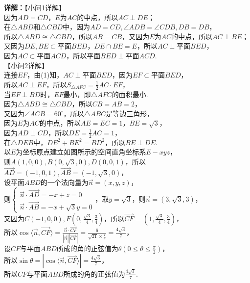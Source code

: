 \begin{question}[points=12]
\begin{solution}
\textbf{详解：}【小问1详解】\\因为$AD=CD$，$E$为$AC$的中点，所以$AC\perp DE$；\\在$\triangle ABD$和$\triangle CBD$中，因为$AD=CD, \angle ADB=\angle CDB, DB=DB$，\\所以$\triangle ABD \cong \triangle CBD$，所以$AB=CB$，又因为$E$为$AC$的中点，所以$AC\perp BE$；\\又因为$DE, BE\subset$平面$BED$，$DE\cap BE=E$，所以$AC\perp$平面$BED$，\\因为$AC\subset$平面$ACD$，所以平面$BED\perp$平面$ACD$.\\【小问2详解】\\连接$EF$，由(1)知，$AC\perp$平面$BED$，因为$EF\subset$平面$BED$，\\所以$AC\perp EF$，所以$S_{\triangle AFC}=\frac{1}{2}AC\cdot EF$，\\当$EF\perp BD$时，$EF$最小，即$\triangle AFC$的面积最小.\\因为$\triangle ABD\cong\triangle CBD$，所以$CB=AB=2$，\\又因为$\angle ACB=60^{\circ}$，所以$\triangle ABC$是等边三角形，\\因为$E$为$AC$的中点，所以$AE=EC=1$，$BE=\sqrt{3}$，\\因为$AD\perp CD$，所以$DE=\frac{1}{2}AC=1$，\\在$\triangle DEB$中，$DE^2+BE^2=BD^2$，所以$BE\perp DE$.\\以$E$为坐标原点建立如图所示的空间直角坐标系$E-xyz$，\\则$A(1,0,0), B(0,\sqrt{3},0), D(0,0,1)$，所以$\overrightarrow{AD}=(-1,0,1), \overrightarrow{AB}=(-1,\sqrt{3},0)$，\\设平面$ABD$的一个法向量为$\vec{n}=(x,y,z)$，\\则$\begin{cases} \vec{n}\cdot\overrightarrow{AD} = -x+z=0 \\ \vec{n}\cdot\overrightarrow{AB} = -x+\sqrt{3}y=0 \end{cases}$，取$y=\sqrt{3}$，则$\vec{n}=(3,\sqrt{3},3)$，\\又因为$C(-1,0,0), F\left(0,\frac{\sqrt{3}}{4},\frac{3}{4}\right)$，所以$\overrightarrow{CF}=\left(1,\frac{\sqrt{3}}{4},\frac{3}{4}\right)$，\\所以$\cos\langle\vec{n},\overrightarrow{CF}\rangle = \frac{\vec{n}\cdot\overrightarrow{CF}}{|\vec{n}||\overrightarrow{CF}|} = \frac{6}{\sqrt{21}\times\frac{7}{4}} = \frac{4\sqrt{3}}{7}$，\\设$CF$与平面$ABD$所成的角的正弦值为$\theta\left(0\leq\theta\leq\frac{\pi}{2}\right)$，\\所以$\sin\theta = |\cos\langle\vec{n},\overrightarrow{CF}\rangle| = \frac{4\sqrt{3}}{7}$，\\所以$CF$与平面$ABD$所成的角的正弦值为$\frac{4\sqrt{3}}{7}$.
\end{solution}
\end{question}

